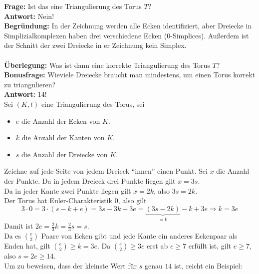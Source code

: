 \begin{problem}[1]

  \textbf{Frage:} Ist das eine Triangulierung des Torus \( T \)? \\
  \textbf{Antwort:} Nein! \\
  \textbf{Begründung:} In der Zeichnung werden alle Ecken identifiziert, aber Dreiecke in Simplizialkomplexen haben drei verschiedene Ecken (0-Simplices). Außerdem ist der Schnitt der zwei Dreiecke in er Zeichnung kein Simplex. \\
  \\
  \textbf{Überlegung:} Was ist dann eine korrekte Triangulierung des Torus \( T \)? \\

  \textbf{Bonusfrage:} Wieviele Dreiecke braucht man mindestens, um einen Torus korrekt zu triangulieren? \\
  \textbf{Antwort:} 14! \\
  Sei \( (K,t) \) eine Triangulierung des Torus, sei 
  \begin{itemize}
    \item \( e \) die Anzahl der Ecken von \( K \).
    \item \( k \) die Anzahl der Kanten von \( K \).
    \item \( s \) die Anzahl der Dreiecke von \( K \).
  \end{itemize} 
  Zeichne auf jede Seite von jedem Dreieck ``innen'' einen Punkt. Sei \( x \) die Anzahl der Punkte.
  Da in jedem Dreieck drei Punkte liegen gilt \( x = 3s \). \\
  Da in jeder Kante zwei Punkte liegen gilt \( x = 2k \), also \( 3s = 2k \). \\
  Der Torus hat Euler-Charakteristik \( 0 \), also gilt
  \begin{equation*}
    3 \cdot 0 = 3 \cdot (s - k + e) = 3s - 3k +3e = \underbrace{(3s -2k)}_{= 0} - k + 3e \Rightarrow k = 3e
  \end{equation*}
  Damit ist \( 2e = \frac{2}{3} k = \frac{2}{3} s = s \). \\

  Da es \( \binom{e}{2} \) Paare von Ecken gibt und jede Kante ein anderes Eckenpaar als Enden hat, gilt  \( \binom{e}{2} \geq k = 3e \). Da \( \binom{e}{2} \geq 3e \) erst ab \( e \geq 7 \) erfüllt ist, gilt \( e \geq 7 \), also \( s = 2e \geq 14 \). \\
  Um zu beweisen, dass der kleinste Wert für \( s \) genau \( 14 \) ist, reicht ein Beispiel: 

\end{problem}

